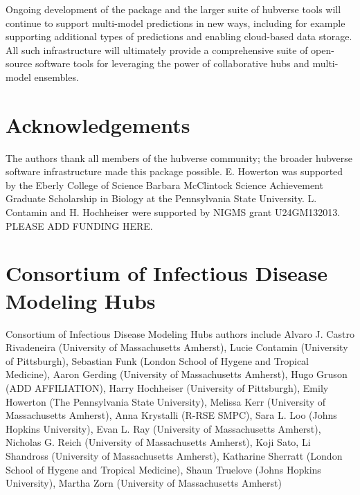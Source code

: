 \documentclass[
  article,
  shortnames,
  notitle]{jss}
\begin{document}
Ongoing development of the  package and the larger
suite of hubverse tools will continue to support multi-model predictions
in new ways, including for example supporting additional types of
predictions and enabling cloud-based data storage. All such
infrastructure will ultimately provide a comprehensive suite of
open-source software tools for leveraging the power of collaborative
hubs and multi-model ensembles.

\section*{Acknowledgements}\label{acknowledgements}

The authors thank all members of the hubverse community; the broader
hubverse software infrastructure made this package possible. E. Howerton
was supported by the Eberly College of Science Barbara McClintock
Science Achievement Graduate Scholarship in Biology at the Pennsylvania
State University. L. Contamin and H. Hochheiser were supported by NIGMS
grant U24GM132013. PLEASE ADD FUNDING HERE.

\section*{Consortium of Infectious Disease Modeling
Hubs}\label{consortium-of-infectious-disease-modeling-hubs}

Consortium of Infectious Disease Modeling Hubs authors include Alvaro J.
Castro Rivadeneira (University of Massachusetts Amherst), Lucie Contamin
(University of Pittsburgh), Sebastian Funk (London School of Hygene and
Tropical Medicine), Aaron Gerding (University of Massachusetts Amherst),
Hugo Gruson (ADD AFFILIATION), Harry Hochheiser (University of
Pittsburgh), Emily Howerton (The Pennsylvania State University), Melissa
Kerr (University of Massachusetts Amherst), Anna Krystalli (R-RSE SMPC),
Sara L. Loo (Johns Hopkins University), Evan L. Ray (University of
Massachusetts Amherst), Nicholas G. Reich (University of Massachusetts
Amherst), Koji Sato, Li Shandross (University of Massachusetts Amherst),
Katharine Sherratt (London School of Hygene and Tropical Medicine),
Shaun Truelove (Johns Hopkins University), Martha Zorn (University of
Massachusetts Amherst)


\renewcommand\refname{References}
  
\end{document}
